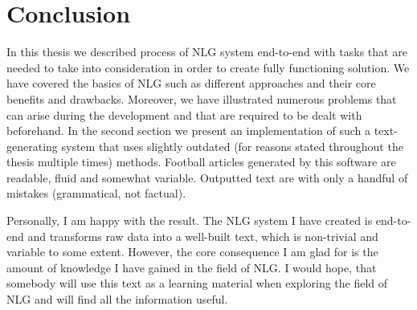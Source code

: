 \chapter*{Conclusion}
In this thesis we described process of NLG system end-to-end with tasks that are needed to take into consideration in order to create fully functioning solution. We have covered the basics of NLG such as different approaches and their core benefits and drawbacks. Moreover, we have illustrated numerous problems that can arise during the development and that are required to be dealt with beforehand.
In the second section we present an implementation of such a text-generating system that uses slightly outdated (for reasons stated throughout the thesis multiple times) methods. Football articles generated by this software are readable, fluid and somewhat variable. Outputted text are with only a handful of mistakes (grammatical, not factual). 

Personally, I am happy with the result. The NLG system I have created is end-to-end and transforms raw data into a well-built text, which is non-trivial and variable to some extent. However, the core consequence I am glad for is the amount of knowledge I have gained in the field of NLG. I would hope, that somebody will use this text as a learning material when exploring the field of NLG and will find all the information useful.
